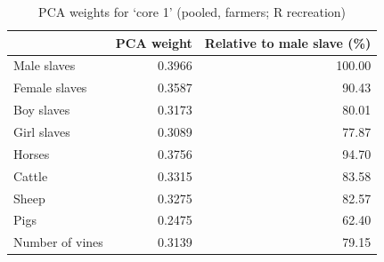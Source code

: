 \begin{table}

\caption{PCA weights for `core 1' (pooled, farmers; R recreation)}
\centering
\begin{tabular}[t]{lrr}
\toprule
  & PCA weight & Relative to male slave (\%)\\
\midrule
Male slaves & 0.3966 & 100.00\\
Female slaves & 0.3587 & 90.43\\
Boy slaves & 0.3173 & 80.01\\
Girl slaves & 0.3089 & 77.87\\
Horses & 0.3756 & 94.70\\
\addlinespace
Cattle & 0.3315 & 83.58\\
Sheep & 0.3275 & 82.57\\
Pigs & 0.2475 & 62.40\\
Number of vines & 0.3139 & 79.15\\
\bottomrule
\end{tabular}
\end{table}
